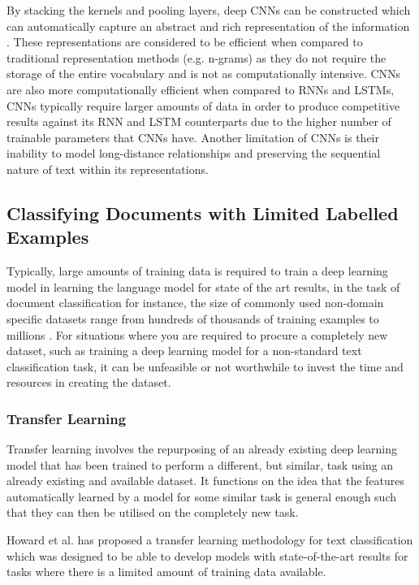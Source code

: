 \documentclass[a4paper,twoside,phd]{BYUPhys}
\begin{document}
By stacking the kernels and pooling layers, deep CNNs can be constructed which can automatically capture an abstract and rich representation of the information \cite{Young}. These representations are considered to be efficient when compared to traditional representation methods (e.g. n-grams) as they do not require the storage of the entire vocabulary and is not as computationally intensive. CNNs are also more computationally efficient when compared to RNNs and LSTMs, CNNs typically require larger amounts of data in order to produce competitive results against its RNN and LSTM counterparts due to the higher number of trainable parameters that CNNs have. Another limitation of CNNs is their inability to model long-distance relationships and preserving the sequential nature of text within its representations.

\subsection{Classifying Documents with Limited Labelled Examples}
\label{sec:TransferLearning}
Typically, large amounts of training data is required to train a deep learning model in learning the language model for state of the art results, in the task of document classification for instance, the size of commonly used non-domain specific datasets range from hundreds of thousands of training examples to millions \cite{Zhang} \cite{Conneau2017}. For situations where you are required to procure a completely new dataset, such as training a deep learning model for a non-standard text classification task, it can be unfeasible  or not worthwhile to invest the time and resources in creating the dataset. 

\subsubsection{Transfer Learning}
\label{sec:TransferLearningReview}

Transfer learning involves the repurposing of an already existing deep learning model that has been trained to perform a different, but similar, task using an already existing and available dataset. It functions on the idea that the features automatically learned by a model for some similar task is general enough such that they can then be utilised on the completely new task. 

Howard et al. \cite{Howard2018} has proposed a transfer learning methodology for text classification which was designed to be able to develop models with state-of-the-art results for tasks where there is a limited amount of training data available. \newline
\end{document}
